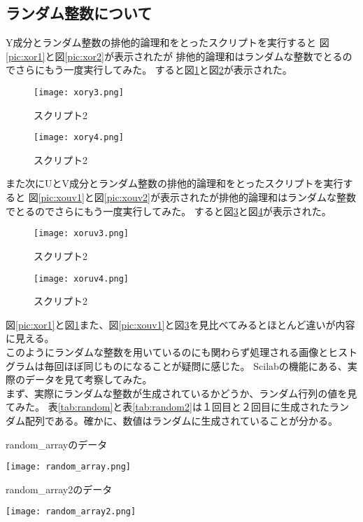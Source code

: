 \documentclass[a4j]{jsarticle}
\begin{document}
\subsection{ランダム整数について}
Y成分とランダム整数の排他的論理和をとったスクリプトを実行すると
図\ref{pic:xor1}と図\ref{pic:xor2}が表示されたが
排他的論理和はランダムな整数でとるのでさらにもう一度実行してみた。
すると図\ref{pic:xor3}と図\ref{pic:xor4}が表示された。
\begin{figure}
  \centering
  \texttt{[image: xory3.png]}
  \caption{スクリプト2}
  \label{pic:xor3}
\end{figure}
\begin{figure}
  \centering
  \texttt{[image: xory4.png]}
  \caption{スクリプト2}
  \label{pic:xor4}
\end{figure}
また次にUとV成分とランダム整数の排他的論理和をとったスクリプトを実行すると
図\ref{pic:xouv1}と図\ref{pic:xouv2}が表示されたが排他的論理和はランダムな整数でとるのでさらにもう一度実行してみた。
すると図\ref{pic:xouv3}と図\ref{pic:xouv4}が表示された。
\begin{figure}
  \centering
  \texttt{[image: xoruv3.png]}
  \caption{スクリプト2}
  \label{pic:xouv3}
\end{figure}
\begin{figure}
  \centering
  \texttt{[image: xoruv4.png]}
  \caption{スクリプト2}
  \label{pic:xouv4}
\end{figure}
図\ref{pic:xor1}と図\ref{pic:xor3}また、図\ref{pic:xouv1}と図\ref{pic:xouv3}を見比べてみるとほとんど違いが内容に見える。\\
このようにランダムな整数を用いているのにも関わらず処理される画像とヒストグラムは毎回ほぼ同じものになることが疑問に感じた。
Scilabの機能にある、実際のデータを見て考察してみた。
\\まず、実際にランダムな整数が生成されているかどうか、ランダム行列の値を見てみた。
表\ref{tab:random}と表\ref{tab:random2}は１回目と２回目に生成されたランダム配列である。確かに、数値はランダムに生成されていることが分かる。
\begin{table}
  \centering
  \caption{random\_arrayのデータ}
  \label{tab:random}
    \texttt{[image: random\_array.png]}
\end{table}

\begin{table}
  \centering
  \caption{random\_array2のデータ}
  \label{tab:random2}
    \texttt{[image: random\_array2.png]}
\end{table}
\end{document}
